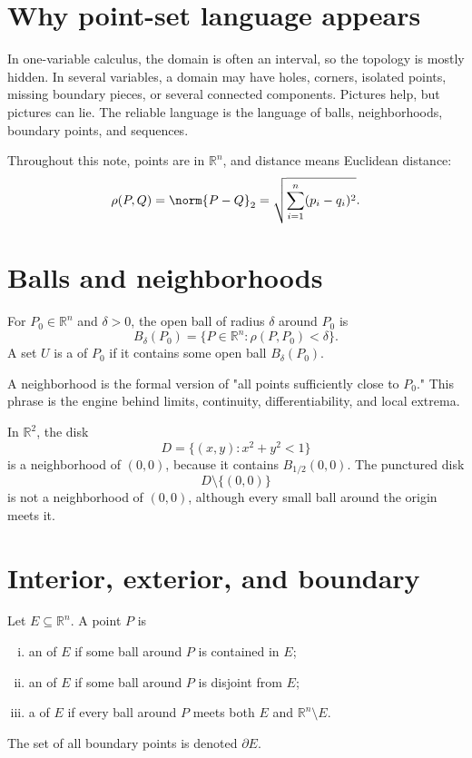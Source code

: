 
\section{Why point-set language appears}

In one-variable calculus, the domain is often an interval, so the topology is mostly hidden.  In several variables, a domain may have holes, corners, isolated points, missing boundary pieces, or several connected components.  Pictures help, but pictures can lie.  The reliable language is the language of balls, neighborhoods, boundary points, and sequences.

Throughout this note, points are in \(\mathbb R^n\), and distance means Euclidean distance:
\[
  \rho(P,Q)=\norm{P-Q}_2
  =\sqrt{\sum_{i=1}^n(p_i-q_i)^2}.
\]

\section{Balls and neighborhoods}

\begin{definition}
For \(P_0\in\mathbb R^n\) and \(\delta>0\), the open ball of radius \(\delta\) around \(P_0\) is
\[
  B_\delta(P_0)=\{P\in\mathbb R^n:\rho(P,P_0)<\delta\}.
\]
A set \(U\) is a  of \(P_0\) if it contains some open ball \(B_\delta(P_0)\).
\end{definition}

A neighborhood is the formal version of "all points sufficiently close to \(P_0\)."  This phrase is the engine behind limits, continuity, differentiability, and local extrema.

\begin{example}
In \(\mathbb R^2\), the disk
\[
  D=\{(x,y):x^2+y^2<1\}
\]
is a neighborhood of \((0,0)\), because it contains \(B_{1/2}(0,0)\).  The punctured disk
\[
  D\setminus\{(0,0)\}
\]
is not a neighborhood of \((0,0)\), although every small ball around the origin meets it.
\end{example}

\section{Interior, exterior, and boundary}

\begin{definition}
Let \(E\subseteq\mathbb R^n\).  A point \(P\) is
\begin{enumerate}[(i)]
  \item an  of \(E\) if some ball around \(P\) is contained in \(E\);
  \item an  of \(E\) if some ball around \(P\) is disjoint from \(E\);
  \item a  of \(E\) if every ball around \(P\) meets both \(E\) and \(\mathbb R^n\setminus E\).
\end{enumerate}
The set of all boundary points is denoted \(\partial E\).
\end{definition}

